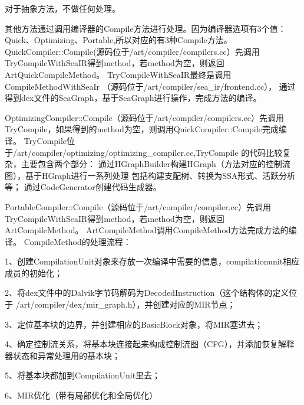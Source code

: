 对于抽象方法，不做任何处理。

其他方法通过调用编译器的Compile方法进行处理。因为编译器选项有3个值：
Quick、Optimizing、Portable,所以对应的有3种Compile方法。
QuickCompiler::Compile(源码位于/art/compiler/compilers.cc）先调用
TryCompileWithSeaIR得到method，若method为空，则返回ArtQuickCompileMethod。
TryCompileWithSeaIR最终是调用CompileMethodWithSeaIr
（源码位于/art/compiler/sea\_ir/frontend.cc），
通过得到dex文件的SeaGraph，基于SeaGraph进行操作，完成方法的编译。

OptimizingCompiler::Compile（源码位于/art/compiler/compilers.cc）先调用
TryCompile，如果得到的method为空，则调用QuickCompiler::Compile完成编译。
TryCompile位于/art/compiler/optimizing/optimizing\_compiler.cc,TryCompile
的代码比较复杂，主要包含两个部分：
通过HGraphBuilder构建HGraph（方法对应的控制流图），基于HGraph进行一系列处理
包括构建支配树、转换为SSA形式、活跃分析等；
通过CodeGenerator创建代码生成器。

PortableCompiler::Compile（源码位于/art/compiler/compiler.cc）先调用           
TryCompileWithSeaIR得到method，若method为空，则返回ArtCompileMethod。
ArtCompileMethod调用CompileMethod方法完成方法的编译。
CompileMethod的处理流程：

1、创建CompilationUnit对象来存放一次编译中需要的信息，compilationunit相应成员的初始化； 

2、将dex文件中的Dalvik字节码解码为DecodedInstruction（这个结构体的定义位于
/art/compiler/dex/mir\_graph.h），并创建对应的MIR节点；

3、定位基本块的边界，并创建相应的BasicBlock对象，将MIR塞进去； 

4、确定控制流关系，将基本块连接起来构成控制流图（CFG），并添加恢复解释器状态和异常处理用的基本块；
 
5、将基本块都加到CompilationUnit里去；

6、MIR优化（带有局部优化和全局优化）
